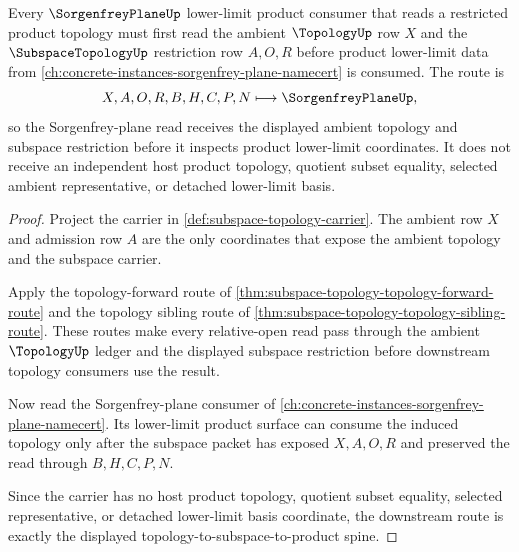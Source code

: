 \begin{theorem}
\label{thm:subspace-topology-forward-sorgenfrey-plane-route}
Every $\SorgenfreyPlaneUp$ lower-limit product consumer that reads a restricted product topology must first read the ambient $\TopologyUp$ row $X$ and the $\SubspaceTopologyUp$ restriction row $A,O,R$ before product lower-limit data from \autoref{ch:concrete-instances-sorgenfrey-plane-namecert} is consumed. The route is
$$
X,A,O,R,B,H,C,P,N \longmapsto \SorgenfreyPlaneUp ,
$$
so the Sorgenfrey-plane read receives the displayed ambient topology and subspace restriction before it inspects product lower-limit coordinates. It does not receive an independent host product topology, quotient subset equality, selected ambient representative, or detached lower-limit basis.
\end{theorem}
\begin{proof}
Project the carrier in \autoref{def:subspace-topology-carrier}. The ambient row $X$ and admission row $A$ are the only coordinates that expose the ambient topology and the subspace carrier.

Apply the topology-forward route of \autoref{thm:subspace-topology-topology-forward-route} and the topology sibling route of \autoref{thm:subspace-topology-topology-sibling-route}. These routes make every relative-open read pass through the ambient $\TopologyUp$ ledger and the displayed subspace restriction before downstream topology consumers use the result.

Now read the Sorgenfrey-plane consumer of \autoref{ch:concrete-instances-sorgenfrey-plane-namecert}. Its lower-limit product surface can consume the induced topology only after the subspace packet has exposed $X,A,O,R$ and preserved the read through $B,H,C,P,N$.

Since the carrier has no host product topology, quotient subset equality, selected representative, or detached lower-limit basis coordinate, the downstream route is exactly the displayed topology-to-subspace-to-product spine.
\end{proof}


